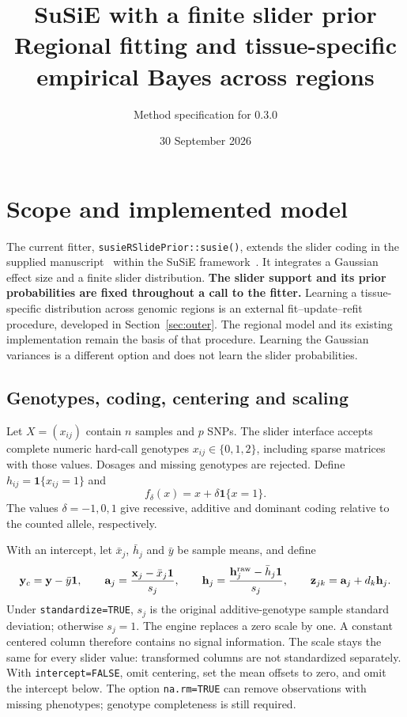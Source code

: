 \documentclass[11pt]{article}
\title{SuSiE with a finite slider prior\\
\large Regional fitting and tissue-specific empirical Bayes across regions}
\author{Method specification for \pkg{} 0.3.0}
\date{30 September 2026}
\newcommand{\ind}{\mathbf 1}
\newcommand{\yb}{\mathbf y_c}
\begin{document}
\maketitle

\section{Scope and implemented model}
\label{sec:model}
The current fitter, \texttt{susieRSlidePrior::susie()}, extends the
slider coding in the supplied manuscript~\cite{slider} within the SuSiE
framework~\cite{susie}. It integrates a Gaussian effect size and a finite
slider distribution. \textbf{The slider support and its prior probabilities
are fixed throughout a call to the fitter.} Learning a tissue-specific distribution across genomic regions is
an external fit--update--refit procedure, developed in Section~\ref{sec:outer}.
The regional model and its existing implementation remain the basis of that procedure.
Learning the Gaussian variances is a different option and does not learn
the slider probabilities.

\subsection{Genotypes, coding, centering and scaling}
Let $X=(x_{ij})$ contain $n$ samples and $p$ SNPs. The slider interface accepts
complete numeric hard-call genotypes $x_{ij}\in\{0,1,2\}$, including sparse
matrices with those values. Dosages and missing genotypes are rejected.
Define $h_{ij}=\ind\{x_{ij}=1\}$ and
\begin{equation}
 f_\delta(x)=x+\delta\ind\{x=1\}.
 \label{eq:coding}
\end{equation}
The values $\delta=-1,0,1$ give recessive, additive and dominant coding
relative to the counted allele, respectively.

With an intercept, let $\bar x_j$, $\bar h_j$ and $\bar y$ be sample means,
and define
\begin{equation}
 \yb=\mathbf y-\bar y\mathbf1,\qquad
 \mathbf a_j=\frac{\mathbf x_j-\bar x_j\mathbf1}{s_j},\qquad
 \mathbf h_j=\frac{\mathbf h_j^{\rm raw}-\bar h_j\mathbf1}{s_j},\qquad
 \mathbf z_{jk}=\mathbf a_j+d_k\mathbf h_j.
 \label{eq:design}
\end{equation}
Under \texttt{standardize=TRUE}, $s_j$ is the original additive-genotype
sample standard deviation; otherwise $s_j=1$. The engine replaces a zero
scale by one. A constant centered column therefore contains no signal
information. The scale stays the same for every slider value: transformed
columns are not standardized separately. With \texttt{intercept=FALSE},
omit centering, set the mean offsets to zero, and omit the intercept below.
The option \texttt{na.rm=TRUE} can remove observations with missing
phenotypes; genotype completeness is still required.
\end{document}
